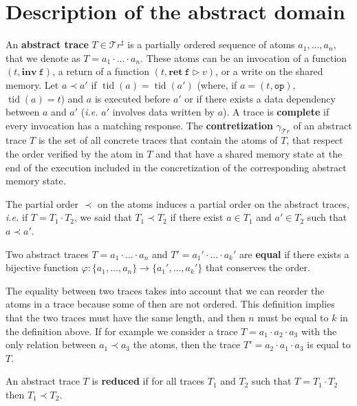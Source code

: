 \documentclass[runningheads]{llncs}
\newcommand{\inv}[1]{\mathbf{inv}\ \mathtt{#1}}
\newcommand{\ret}[2]{\mathbf{ret}\ \mathtt{#1} \vartriangleright #2}
\newcommand{\Traces}{\mathcal T\!r}
\newcommand{\aTraces}{\mathcal T\!r^\sharp}
\DeclareMathOperator{\tid}{tid}
\begin{document}
\section{Description of the abstract domain}
\label{sec:absDom}

\begin{definition}
	An \textbf{abstract trace} $T \in \aTraces$ is a partially ordered sequence of atoms $a_1, \dots, a_n$, that we denote as $T = a_1 \cdot \ldots \cdot a_n$. These atoms can be an invocation of a function $(t, \inv{f})$, a return of a function $(t, \ret{f}{v})$, or a write on the shared memory. Let $a \prec a'$ if $\tid(a) = \tid(a')$  (where, if $a = (t, \mathtt{op})$, $\tid(a) = t$) and $a$ is executed before $a'$ or if there exists a data dependency between $a$ and $a'$ (\emph{i.e.} $a'$ involves data written by $a$). A trace is \textbf{complete} if every invocation has a matching response. The \textbf{contretization} $\gamma_{\Traces}$ of an abstract trace $T$ is the set of all concrete traces that contain the atoms of $T$, that respect the order verified by the atom in $T$ and that have a shared memory state at the end of the execution included in the concretization of the corresponding abstract memory state.
\end{definition}

The partial order $\prec$ on the atoms induces a partial order on the abstract traces, \textit{i.e.} if $T = T_1 \cdot T_2$, we said that $T_1 \prec T_2$ if there exist $a\in T_1$ and $a' \in T_2$ such that $a\prec a'$. 


\begin{definition} \label{def:equality}
		Two abstract traces $T = a_1 \cdot \ldots \cdot a_n$ and $T' = a_1' \cdot \ldots \cdot a_k'$ are \textbf{equal} if there exists a bijective function $\varphi : \{a_1,\dots,a_n\} \rightarrow \{a_1',\dots, a_k'\}$ that conserves the order. 
\end{definition}

The equality between two traces takes into account that we can reorder the atoms in a trace because some of then are not ordered. This definition implies that the two traces must have the same length, and then $n$ must be equal to $k$ in the definition above.
If for example we consider a trace $T = a_1 \cdot a_2 \cdot a_3$ with the only relation between $a_1 \prec a_3$ the atoms, then the trace $T' = a_2 \cdot a_1 \cdot a_3$ is equal to $T$.

\begin{definition}
	An abstract trace $T$ is \textbf{reduced} if for all traces $T_1$ and $T_2$ such that $T=T_1\cdot T_2$ then $T_1 \prec T_2$. 
\end{definition}
\end{document}
